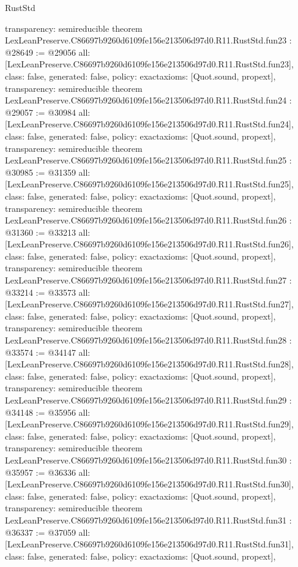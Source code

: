 \begin{lexlean}{RustStd}
\begin{coremodule}
{  transparency: semireducible
}
theorem LexLeanPreserve.C86697b9260d6109fe156e213506d97d0.R11.RustStd.fun23 : @28649 := @29056 {
  all: [LexLeanPreserve.C86697b9260d6109fe156e213506d97d0.R11.RustStd.fun23],
  class: false,
  generated: false,
  policy: exact{axioms: [Quot.sound, propext]},
  transparency: semireducible
}
theorem LexLeanPreserve.C86697b9260d6109fe156e213506d97d0.R11.RustStd.fun24 : @29057 := @30984 {
  all: [LexLeanPreserve.C86697b9260d6109fe156e213506d97d0.R11.RustStd.fun24],
  class: false,
  generated: false,
  policy: exact{axioms: [Quot.sound, propext]},
  transparency: semireducible
}
theorem LexLeanPreserve.C86697b9260d6109fe156e213506d97d0.R11.RustStd.fun25 : @30985 := @31359 {
  all: [LexLeanPreserve.C86697b9260d6109fe156e213506d97d0.R11.RustStd.fun25],
  class: false,
  generated: false,
  policy: exact{axioms: [Quot.sound, propext]},
  transparency: semireducible
}
theorem LexLeanPreserve.C86697b9260d6109fe156e213506d97d0.R11.RustStd.fun26 : @31360 := @33213 {
  all: [LexLeanPreserve.C86697b9260d6109fe156e213506d97d0.R11.RustStd.fun26],
  class: false,
  generated: false,
  policy: exact{axioms: [Quot.sound, propext]},
  transparency: semireducible
}
theorem LexLeanPreserve.C86697b9260d6109fe156e213506d97d0.R11.RustStd.fun27 : @33214 := @33573 {
  all: [LexLeanPreserve.C86697b9260d6109fe156e213506d97d0.R11.RustStd.fun27],
  class: false,
  generated: false,
  policy: exact{axioms: [Quot.sound, propext]},
  transparency: semireducible
}
theorem LexLeanPreserve.C86697b9260d6109fe156e213506d97d0.R11.RustStd.fun28 : @33574 := @34147 {
  all: [LexLeanPreserve.C86697b9260d6109fe156e213506d97d0.R11.RustStd.fun28],
  class: false,
  generated: false,
  policy: exact{axioms: [Quot.sound, propext]},
  transparency: semireducible
}
theorem LexLeanPreserve.C86697b9260d6109fe156e213506d97d0.R11.RustStd.fun29 : @34148 := @35956 {
  all: [LexLeanPreserve.C86697b9260d6109fe156e213506d97d0.R11.RustStd.fun29],
  class: false,
  generated: false,
  policy: exact{axioms: [Quot.sound, propext]},
  transparency: semireducible
}
theorem LexLeanPreserve.C86697b9260d6109fe156e213506d97d0.R11.RustStd.fun30 : @35957 := @36336 {
  all: [LexLeanPreserve.C86697b9260d6109fe156e213506d97d0.R11.RustStd.fun30],
  class: false,
  generated: false,
  policy: exact{axioms: [Quot.sound, propext]},
  transparency: semireducible
}
theorem LexLeanPreserve.C86697b9260d6109fe156e213506d97d0.R11.RustStd.fun31 : @36337 := @37059 {
  all: [LexLeanPreserve.C86697b9260d6109fe156e213506d97d0.R11.RustStd.fun31],
  class: false,
  generated: false,
  policy: exact{axioms: [Quot.sound, propext]},
}
\end{coremodule}
\end{lexlean}
